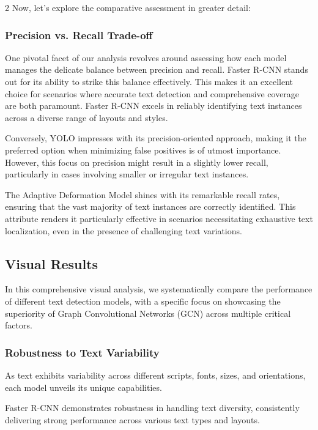 \documentclass[sn-mathphys,Numbered]{sn-jnl}%
\begin{document}
\begin{multicols}{2}
Now, let's explore the comparative assessment in greater detail:

\subsubsection{Precision vs. Recall Trade-off}
One pivotal facet of our analysis revolves around assessing how each model manages the delicate balance between precision and recall. Faster R-CNN stands out for its ability to strike this balance effectively. This makes it an excellent choice for scenarios where accurate text detection and comprehensive coverage are both paramount. Faster R-CNN excels in reliably identifying text instances across a diverse range of layouts and styles.

Conversely, YOLO impresses with its precision-oriented approach, making it the preferred option when minimizing false positives is of utmost importance. However, this focus on precision might result in a slightly lower recall, particularly in cases involving smaller or irregular text instances.

The Adaptive Deformation Model shines with its remarkable recall rates, ensuring that the vast majority of text instances are correctly identified. This attribute renders it particularly effective in scenarios necessitating exhaustive text localization, even in the presence of challenging text variations.

\subsection{Visual Results}
In this comprehensive visual analysis, we systematically compare the performance of different text detection models, with a specific focus on showcasing the superiority of Graph Convolutional Networks (GCN) across multiple critical factors.

\subsubsection{Robustness to Text Variability} 
As text exhibits variability across different scripts, fonts, sizes, and orientations, each model unveils its unique capabilities. 

Faster R-CNN demonstrates robustness in handling text diversity, consistently delivering strong performance across various text types and layouts.



\end{multicols}
\end{document}
